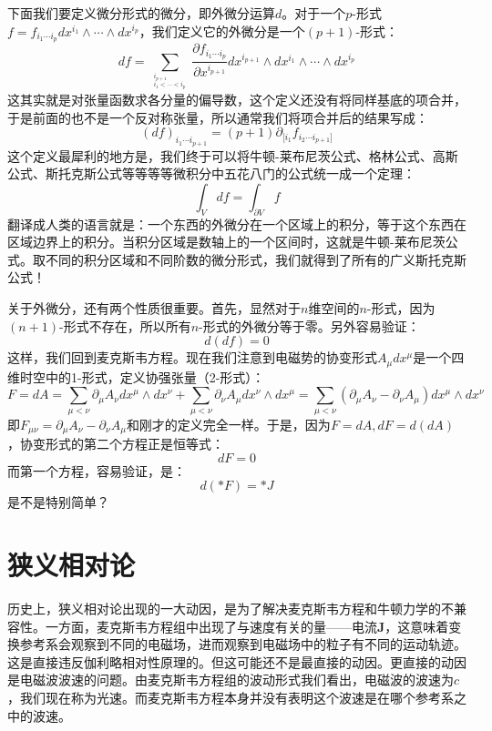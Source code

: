 \documentclass{ctexart}
\begin{document}
下面我们要定义微分形式的微分，即外微分运算$d$。对于一个$p$-形式$f=f_{i_1\cdots i_p}dx^{i_1}\wedge\cdots\wedge dx^{i_p}$，我们定义它的外微分是一个$(p+1)$-形式：
\begin{equation}
df=\sum_{\begin{array}{c} _{i_{p+1}} \\ _{i_1<\cdots<i_p}\end{array}}\frac{\partial f_{i_1\cdots i_p}}{\partial x^{i_{p+1}}}dx^{i_{p+1}}\wedge dx^{i_1}\wedge\cdots\wedge dx^{i_p}
\end{equation}
这其实就是对张量函数求各分量的偏导数，这个定义还没有将同样基底的项合并，于是前面的也不是一个反对称张量，所以通常我们将项合并后的结果写成：
\begin{equation}
(df)_{i_1\cdots i_{p+1}}=(p+1)\partial_{[i_1}f_{i_2\cdots i_{p+1}]}
\end{equation}
这个定义最犀利的地方是，我们终于可以将牛顿-莱布尼茨公式、格林公式、高斯公式、斯托克斯公式等等等等微积分中五花八门的公式统一成一个定理：
\begin{equation}
\int_V df=\int_{\partial V}f
\end{equation}
翻译成人类的语言就是：一个东西的外微分在一个区域上的积分，等于这个东西在区域边界上的积分。当积分区域是数轴上的一个区间时，这就是牛顿-莱布尼茨公式。取不同的积分区域和不同阶数的微分形式，我们就得到了所有的广义斯托克斯公式！

关于外微分，还有两个性质很重要。首先，显然对于$n$维空间的$n$-形式，因为$(n+1)$-形式不存在，所以所有$n$-形式的外微分等于零。另外容易验证：
\begin{equation}
d(df)=0
\end{equation}
这样，我们回到麦克斯韦方程。现在我们注意到电磁势的协变形式$A_\mu dx^\mu$是一个四维时空中的1-形式，定义协强张量（2-形式）：
\begin{equation}
F=dA=\sum_{\mu<\nu}\partial_\mu A_\nu dx^\mu\wedge dx^\nu+\sum_{\mu<\nu}\partial_\nu A_\mu dx^\nu\wedge dx^\mu=\sum_{\mu<\nu}(\partial_\mu A_\nu-\partial_\nu A_\mu)dx^\mu\wedge dx^\nu
\end{equation}
即$F_{\mu\nu}=\partial_\mu A_\nu-\partial_\nu A_\mu$和刚才的定义完全一样。于是，因为$F=dA,dF=d(dA)$，协变形式的第二个方程正是恒等式：
\begin{equation}
dF=0
\end{equation}
而第一个方程，容易验证，是：
\begin{equation}
d(*F)=*J
\end{equation}
是不是特别简单？

\section{狭义相对论}
历史上，狭义相对论出现的一大动因，是为了解决麦克斯韦方程和牛顿力学的不兼容性。一方面，麦克斯韦方程组中出现了与速度有关的量——电流$\bm{J}$，这意味着变换参考系会观察到不同的电磁场，进而观察到电磁场中的粒子有不同的运动轨迹。这是直接违反伽利略相对性原理的。但这可能还不是最直接的动因。更直接的动因是电磁波波速的问题。由麦克斯韦方程组的波动形式我们看出，电磁波的波速为$c$，我们现在称为光速。而麦克斯韦方程本身并没有表明这个波速是在哪个参考系之中的波速。
\end{document}
